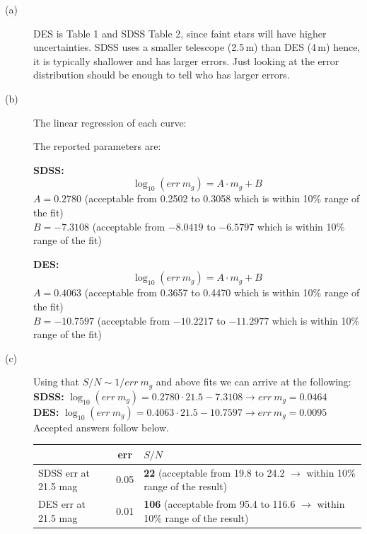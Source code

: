 \begin{description}
\item[(a)] DES is Table 1 and SDSS Table 2, since faint stars will have
higher uncertainties. SDSS uses a smaller telescope (2.5\,m) than DES
(4\,m) hence, it is typically shallower and has larger errors. Just looking
at the error distribution should be enough to tell who has larger errors.

\item[(b)] The linear regression of each curve:


The reported parameters are:

\textbf{SDSS:}
\[ \log_{10}(err\ m_g) = A \cdot m_g + B \]
$A = 0.2780$ (acceptable from 0.2502 to 0.3058 which is within 10\% range
of the fit)\\
$B = -7.3108$ (acceptable from $-8.0419$ to $-6.5797$ which is within 10\%
range of the fit)

\textbf{DES:}
\[ \log_{10}(err\ m_g) = A \cdot m_g + B \]
$A = 0.4063$ (acceptable from 0.3657 to 0.4470 which is within 10\% range
of the fit)\\
$B = -10.7597$ (acceptable from $-10.2217$ to $-11.2977$ which is within
10\% range of the fit)

\item[(c)] Using that $S/N \sim 1/err\ m_g$ and above fits we can arrive at
the following:\\
\textbf{SDSS:} $\log_{10}(err\ m_g) = 0.2780 \cdot 21.5 - 7.3108
\rightarrow err\ m_g = 0.0464$\\
\textbf{DES:} $\log_{10}(err\ m_g) = 0.4063 \cdot 21.5 - 10.7597
\rightarrow err\ m_g = 0.0095$\\
Accepted answers follow below.

\begin{center}
\begin{tabular}{|l|c|l|}
\hline
 & err & $S/N$ \\
\hline
SDSS err at 21.5 mag & 0.05 & \textbf{22} (acceptable from 19.8 to 24.2
$\rightarrow$ within 10\% range of the result) \\
\hline
DES err at 21.5 mag & 0.01 & \textbf{106} (acceptable from 95.4 to 116.6
$\rightarrow$ within 10\% range of the result) \\
\hline
\end{tabular}
\end{center}


\end{description}
